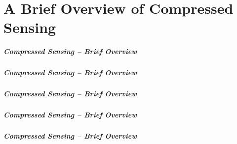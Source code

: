 \part{A Brief Overview \newline of Compressed Sensing}
\frame{\partpage}


\begin{frame} \frametitle{Compressed Sensing -- Brief Overview}
\begin{center}  \end{center}
\end{frame}


\begin{frame} \frametitle{Compressed Sensing -- Brief Overview}
\begin{center}  \end{center}
\end{frame}


\begin{frame} \frametitle{Compressed Sensing -- Brief Overview}
\begin{center}  \end{center}
\end{frame}


\begin{frame} \frametitle{Compressed Sensing -- Brief Overview}
\begin{center}  \end{center}
\end{frame}


\begin{frame} \frametitle{Compressed Sensing -- Brief Overview}
\begin{center}  \end{center}
\end{frame}



